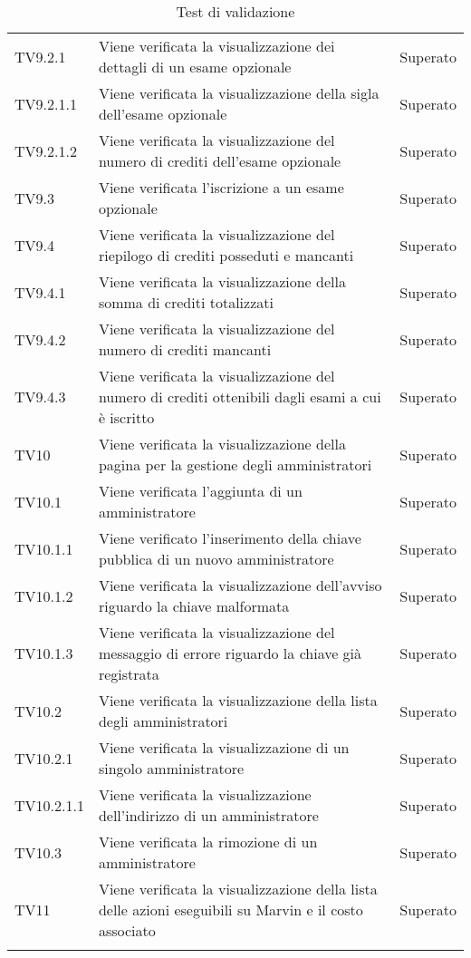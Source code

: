 \documentclass[PianoDiQualifica.tex]{subfiles}
\begin{document}
\begin{longtable}[H]{P{2cm}P{8.5cm}P{3cm}}
	TV9.2.1 & Viene verificata la visualizzazione dei dettagli di un esame opzionale & Superato \\
	TV9.2.1.1 & Viene verificata la visualizzazione della sigla dell'esame opzionale & Superato \\
	TV9.2.1.2 & Viene verificata la visualizzazione del numero di crediti dell'esame opzionale & Superato \\
	TV9.3 & Viene verificata l'iscrizione a un esame opzionale & Superato \\
	TV9.4 & Viene verificata la visualizzazione del riepilogo di crediti posseduti e mancanti & Superato \\
	TV9.4.1 & Viene verificata la visualizzazione della somma di crediti totalizzati & Superato \\
	TV9.4.2 & Viene verificata la visualizzazione del numero di crediti mancanti & Superato \\
	TV9.4.3 & Viene verificata la visualizzazione del numero di crediti ottenibili dagli esami a cui è iscritto & Superato \\
	TV10 & Viene verificata la visualizzazione della pagina per la gestione degli amministratori & Superato \\ 
	TV10.1 & Viene verificata l'aggiunta di un amministratore & Superato \\ 
	TV10.1.1 & Viene verificato l'inserimento della chiave pubblica di un nuovo amministratore & Superato \\ 
	TV10.1.2 & Viene verificata la visualizzazione dell'avviso riguardo la chiave malformata & Superato \\ 
	TV10.1.3 & Viene verificata la visualizzazione del messaggio di errore riguardo la chiave già registrata & Superato \\ 
	TV10.2 & Viene verificata la visualizzazione della lista degli amministratori & Superato \\ 
	TV10.2.1 & Viene verificata la visualizzazione di un singolo amministratore & Superato \\ 
	TV10.2.1.1 & Viene verificata la visualizzazione dell'indirizzo di un amministratore & Superato \\ 
	TV10.3 & Viene verificata la rimozione di un amministratore & Superato \\ 
	TV11 & Viene verificata la visualizzazione della lista delle azioni eseguibili su Marvin e il costo associato & Superato \\ 

	\hiderowcolors
	\caption{Test di validazione}
\end{longtable}
\end{document}
